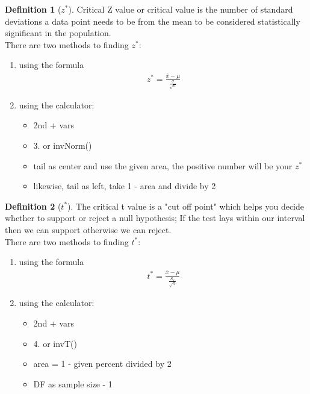 \documentclass{article}
\theoremstyle{definition}
\newtheorem{definition}{Definition}[section]
\theoremstyle{remark}
\begin{document}
\begin{definition}[$z^{*}$] \label{critz}
  Critical Z value or critical value is the number of standard deviations a data point needs
  to be from the mean to be considered statistically significant in the population.\\
  There are two methods to finding $z^{*}$:\\
  \begin{enumerate}
    \item using the formula 
    \begin{equation}
      \begin{aligned}
        z^{*} = \frac{\bar{x} - \mu}{\frac{\sigma}{\sqrt{n}}}
      \end{aligned}
    \end{equation}
    \item using the calculator: 
    \begin{itemize}
      \item 2nd + vars
      \item 3. or invNorm()
      \item tail as center and use the given area, the positive number will be your $z^{*}$
      \item likewise, tail as left, take 1 - area and divide by 2
    \end{itemize}
  \end{enumerate}
\end{definition}

\begin{definition}[$t^{*}$]
  The critical t value is a "cut off point" which helps you decide whether to support
  or reject a null hypothesis; If the test lays within our interval then we can support otherwise we can reject.\\
  There are two methods to finding $t^{*}$:\\
  \begin{enumerate}
    \item using the formula 
    \begin{equation}
      \begin{aligned}
        t^{*} = \frac{\bar{x} - \mu}{\frac{S_x}{\sqrt{n}}}
      \end{aligned}
    \end{equation}
    \item using the calculator: 
    \begin{itemize}
      \item 2nd + vars
      \item 4. or invT()
      \item area = 1 - given percent divided by 2
      \item DF as sample size - 1
    \end{itemize}
  \end{enumerate}
\end{definition}
\end{document}
